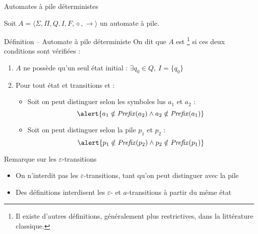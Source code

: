 
\begingroup

\begin{frame}{Automates à pile déterministes}

  Soit $A = \langle \Sigma, \Pi, Q, I, F, \diamond, \rightarrow \rangle$ un automate à pile.

  \begin{block}{Définition -- Automate à pile déterministe}
    On dit que $A$ est \footnote{Il existe d'autres définitions, généralement plus restrictives, dans la littérature classique.} si ces deux conditions sont vérifiées : 
    \begin{enumerate}
    \item $A$ ne possède qu'un seul état initial : \alert{$\exists q_0\in Q,~I = \{q_0\}$}
    \item Pour tout état  et transitions 
      et  :
      \begin{itemize}
      \item\vspace{2mm} Soit on peut distinguer selon les symboles lus $a_1$ et $a_2$ :
        $$\alert{a_1 \notin \mathit{Prefix}(a_2) \land a_2 \notin \mathit{Prefix}(a_1)}$$
      \item Soit on peut distinguer selon la pile  $p_1$ et $p_2$ :
        $$\alert{p_1 \notin \mathit{Prefix}(p_2) \land p_2 \notin \mathit{Prefix}(p_1)}$$
      \end{itemize}
    \end{enumerate}
  \end{block}

  \begin{block}{Remarque sur les $\varepsilon$-transitions}
    \begin{itemize}
    \item On n'interdit pas les $\varepsilon$-transitions, tant qu'on peut distinguer avec la pile
    \item Des définitions interdisent les $\varepsilon$- et $a$-transitions à partir du même état
    \end{itemize}
  \end{block}

\end{frame}


\endgroup
